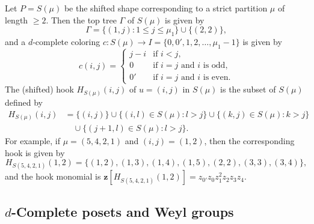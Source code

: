 \documentclass[ALCO,ThmDefs,Unicode,epreuves]{cedram}
\newcommand\vectz{\boldsymbol{z}}
\begin{document}
\begin{exam}
\label{ex:shifted_hc}
Let $P = S(\mu)$ be the shifted shape corresponding to a strict partition $\mu$ of length $\ge 2$.
Then the top tree $\Gamma$ of $S(\mu)$ is given by
$$
\Gamma = \{ (1,j) : 1 \le j \le \mu_1 \} \cup \{ (2, 2) \},
$$
and a $d$-complete coloring $c : S(\mu) \to I = \{ 0, 0', 1, 2, \dots, \mu_1 - 1 \}$ is given by
$$
c(i,j)
 =
\begin{cases}
 j-i &\text{if $i < j$,} \\
 0 &\text{if $i=j$ and $i$ is odd,} \\
 0' &\text{if $i=j$ and $i$ is even.}
\end{cases}
$$
The (shifted) hook $H_{S(\mu)}(i,j)$ of $u = (i,j)$ in $S(\mu)$ is the subset of $S(\mu)$ defined by
\begin{align*}
H_{S(\mu)}(i,j)
 &=
\{ (i,j) \}
\cup
\{ (i,l) \in S(\mu) : l > j \}
\cup
\{ (k,j) \in S(\mu) : k > j \}
\\
&\quad
\cup
\{ (j+1,l) \in S(\mu) : l > j \}.
\end{align*}
For example, if $\mu = (5,4,2,1)$ and $(i,j) = (1,2)$, then the corresponding hook is given by
$$
H_{S(5,4,2,1)}(1,2)
 =
\{ (1,2), (1,3), (1,4), (1,5), (2,2), (3,3), (3,4) \},
$$
and the hook monomial is 
$\vectz[H_{S(5,4,2,1)}(1,2)]= z_{0'}z_{0} z_1^2 z_2 z_3 z_4$.
\end{exam}

\subsection{%
\texorpdfstring{$d$}{d}-Complete posets and Weyl groups
}\label{subsec2.2}
\end{document}
